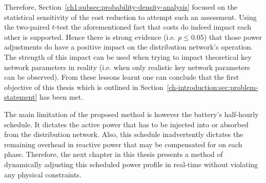 Therefore, Section~\ref{ch1:subsec:probability-density-analysis} focused on the statistical sensitivity of the cost reduction to attempt such an assessment.
Using the two-paired $t$-test the aforementioned fact that costs do indeed impact each other is supported.
Hence there is strong evidence (i.e. $p\leq0.05$) that those power adjustments do have a positive impact on the distribution network's operation.
The strength of this impact can be used when trying to impact theoretical key network parameters in reality (i.e. when only realistic key network parameters can be observed).
From these lessons learnt one can conclude that the first objective of this thesis which is outlined in Section~\ref{ch-introduction:sec:problem-statement} has been met.

The main limitation of the proposed method is however the battery's half-hourly schedule.
It dictates the active power that has to be injected into or absorbed from the distribution network.
Also, this schedule inadvertently dictates the remaining overhead in reactive power that may be compensated for on each phase.
Therefore, the next chapter in this thesis presents a method of dynamically adjusting this scheduled power profile in real-time without violating any physical constraints.
